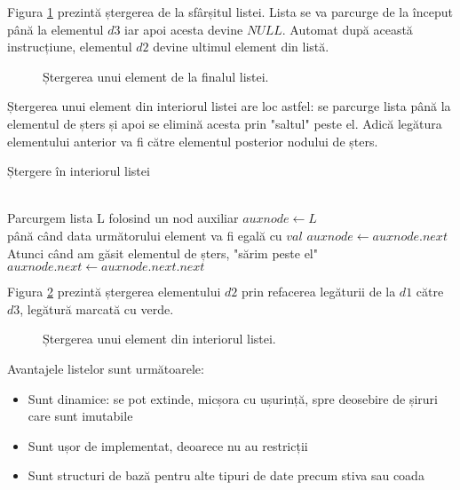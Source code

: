 Figura \ref{fig:deleteend} prezintă ștergerea de la sfârșitul listei.
Lista se va parcurge de la început până la elementul $d3$ iar apoi acesta devine $NULL$. Automat după această instrucțiune, elementul $d2$ devine ultimul element din listă.

\begin{figure}[H] 
	\centering	
	{
	}
	\caption{Ștergerea unui element de la finalul listei.} 
	\label{fig:deleteend}
\end{figure}

Ștergerea unui element din interiorul listei are loc astfel: se parcurge lista până la elementul de șters și apoi se elimină acesta prin "saltul" peste el. Adică legătura elementului anterior va fi către elementul posterior nodului de șters.

\begin{algorithm}[H]
	\caption{Ștergere în interiorul listei}\label{alg:deleteinterior}
	\begin{algorithmic}[1]
		 \\	
		\Comment Parcurgem lista L folosind un nod auxiliar  \hfill \tab{}\tab{}
		\State $auxnode \gets L$ \\
		\Comment până când data următorului element va fi egală cu $val$\hfill  \tab{} 
		\While {$auxnode.next.d \neq  val$}		
		\State $auxnode \gets auxnode.next$
		\EndWhile 	\\
		\Comment Atunci când am găsit elementul de șters, "sărim peste el"\hfill \tab{} 
		\State $auxnode.next \gets auxnode.next.next$
		\EndProcedure
	\end{algorithmic}
\end{algorithm}


Figura \ref{fig:deleteinterior} prezintă ștergerea elementului $d2$ prin refacerea legăturii de la $d1$ către $d3$, legătură marcată cu verde.

\begin{figure}[H] 
	\centering	
	{
	}
	\caption{Ștergerea unui element din interiorul listei.} 
	\label{fig:deleteinterior}
\end{figure}

Avantajele listelor sunt următoarele:

\begin{itemize}
	\item {Sunt dinamice: se pot extinde, micșora cu ușurință, spre deosebire de șiruri care sunt imutabile}
	\item {Sunt ușor de implementat, deoarece nu au restricții}
	\item {Sunt structuri de bază pentru alte tipuri de date precum stiva sau coada}
\end{itemize}

